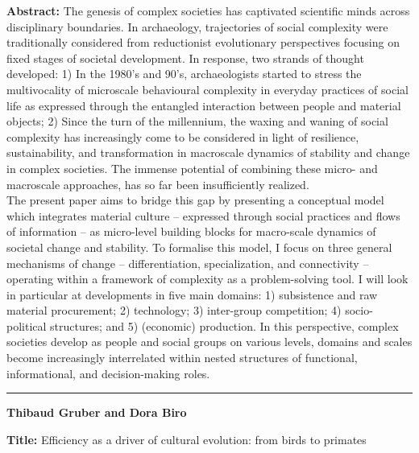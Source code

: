 \documentclass[]{article}
\begin{document}
\textbf{Abstract:} The genesis of complex societies has captivated
scientific minds across disciplinary boundaries. In archaeology,
trajectories of social complexity were traditionally considered from
reductionist evolutionary perspectives focusing on fixed stages of
societal development. In response, two strands of thought developed: 1)
In the 1980's and 90's, archaeologists started to stress the
multivocality of microscale behavioural complexity in everyday practices
of social life as expressed through the entangled interaction between
people and material objects; 2) Since the turn of the millennium, the
waxing and waning of social complexity has increasingly come to be
considered in light of resilience, sustainability, and transformation in
macroscale dynamics of stability and change in complex societies. The
immense potential of combining these micro- and macroscale approaches,
has so far been insufficiently realized.\\
The present paper aims to bridge this gap by presenting a conceptual
model which integrates material culture -- expressed through social
practices and flows of information -- as micro-level building blocks for
macro-scale dynamics of societal change and stability. To formalise this
model, I focus on three general mechanisms of change -- differentiation,
specialization, and connectivity -- operating within a framework of
complexity as a problem-solving tool. I will look in particular at
developments in five main domains: 1) subsistence and raw material
procurement; 2) technology; 3) inter-group competition; 4)
socio-political structures; and 5) (economic) production. In this
perspective, complex societies develop as people and social groups on
various levels, domains and scales become increasingly interrelated
within nested structures of functional, informational, and
decision-making roles.

\rule{4cm}{.4pt}

{\bf {Thibaud Gruber and Dora Biro}}

\textbf{Title:} Efficiency as a driver of cultural evolution: from birds
to primates
\end{document}
